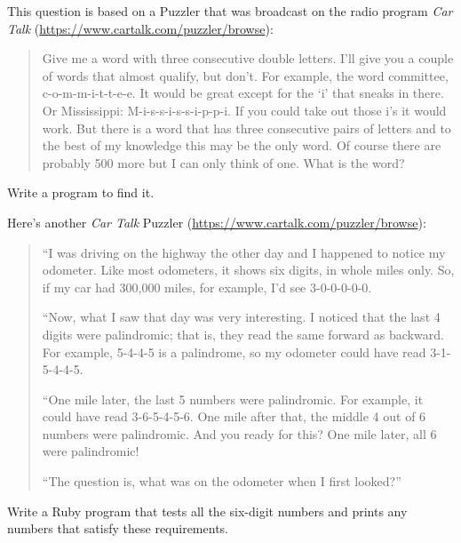\documentclass[10pt]{book}
\begin{document}
\begin{exercise}

This question is based on a Puzzler that was broadcast on the radio
program {\em Car Talk} 
(\url{https://www.cartalk.com/puzzler/browse}):

\begin{quote}
Give me a word with three consecutive double letters. I'll give you a
couple of words that almost qualify, but don't. For example, the word
committee, c-o-m-m-i-t-t-e-e. It would be great except for the `i' that
sneaks in there. Or Mississippi: M-i-s-s-i-s-s-i-p-p-i. If you could
take out those i's it would work. But there is a word that has three
consecutive pairs of letters and to the best of my knowledge this may
be the only word. Of course there are probably 500 more but I can only
think of one. What is the word?
\end{quote}

Write a program to find it.

\end{exercise}


\begin{exercise}
Here's another {\em Car Talk}
Puzzler (\url{https://www.cartalk.com/puzzler/browse}):

\begin{quote}
``I was driving on the highway the other day and I happened to
notice my odometer. Like most odometers, it shows six digits,
in whole miles only. So, if my car had 300,000
miles, for example, I'd see 3-0-0-0-0-0.

``Now, what I saw that day was very interesting. I noticed that the
last 4 digits were palindromic; that is, they read the same forward as
backward. For example, 5-4-4-5 is a palindrome, so my odometer
could have read 3-1-5-4-4-5.

``One mile later, the last 5 numbers were palindromic. For example, it
could have read 3-6-5-4-5-6.  One mile after that, the middle 4 out of
6 numbers were palindromic.  And you ready for this? One mile later,
all 6 were palindromic!

``The question is, what was on the odometer when I first looked?''
\end{quote}

Write a Ruby program that tests all the six-digit numbers and prints
any numbers that satisfy these requirements.  

\end{exercise}
\end{document}
